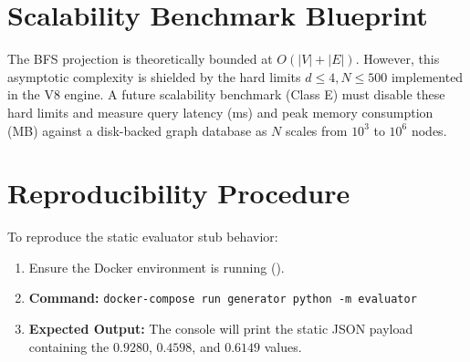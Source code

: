 \section{Scalability Benchmark Blueprint}
\label{app-sec:eval-scalability}
The BFS projection is theoretically bounded at $O(|V| + |E|)$. However, this asymptotic complexity is shielded by the hard limits $d \le 4, N \le 500$ implemented in the V8 engine. A future scalability benchmark (Class E) must disable these hard limits and measure query latency (ms) and peak memory consumption (MB) against a disk-backed graph database as $N$ scales from $10^3$ to $10^6$ nodes.

\section{Reproducibility Procedure}
\label{app-sec:eval-repro}
To reproduce the static evaluator stub behavior:
\begin{enumerate}
    \item Ensure the Docker environment is running ().
    \item \textbf{Command:} \texttt{docker-compose run generator python -m evaluator}
    \item \textbf{Expected Output:} The console will print the static JSON payload containing the $0.9280$, $0.4598$, and $0.6149$ values.
\end{enumerate}
